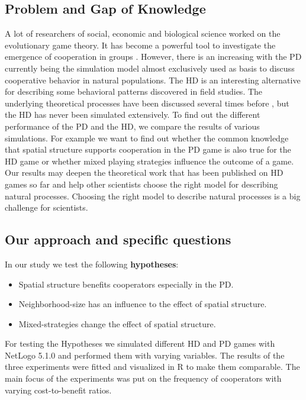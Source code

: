 \subsection{Problem and Gap of Knowledge}
A lot of researchers of social, economic and biological science worked on the evolutionary game theory. It has become a powerful tool to investigate the emergence of cooperation in groups \citep{HauertandDoebeli2004}. However, there is an increasing with the PD currently being the simulation model almost exclusively used as basis to discuss cooperative behavior in natural populations. The HD is an interesting alternative for describing some behavioral patterns discovered in field studies\citep{milinski1987}. The underlying theoretical processes have been discussed several times before \citep{nowak1992, milinski1987}, but the HD has never been simulated extensively. To find out the different performance of the PD and the HD, we compare the results of various simulations. For example we want to find out whether the common knowledge that spatial structure supports cooperation in the PD game \citep{nowak1992} is also true for the HD game or whether mixed playing strategies influence the outcome of a game. Our results may deepen the theoretical work that has been published on HD games so far and help other scientists choose the right model for describing natural processes.
Choosing the right model to describe natural processes is a big challenge for scientists. 

\subsection{Our approach and specific questions}

In our study we test the following \textbf{hypotheses}: 

\begin{itemize}
\item Spatial structure benefits cooperators especially in the PD.
\item Neighborhood-size has an influence to the effect of spatial structure.
\item Mixed-strategies change the effect of spatial structure.
\end{itemize}

For testing the Hypotheses we simulated different HD and PD games with NetLogo 5.1.0 \citep{Wilensky1999} and performed them with varying variables. The results of the three experiments were fitted and visualized in R \citep{R} to make them comparable. The main focus of the experiments was put on the frequency of cooperators with varying cost-to-benefit ratios.


